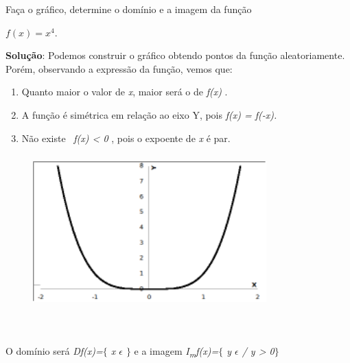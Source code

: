 \begin{texemplo}
Faça o gráfico, determine o domínio e a imagem da função 

\quad  $ f \left( x \right) =x^{4}$.

\begin{justify}
\textbf{Solução}: Podemos construir o gráfico obtendo pontos da função aleatoriamente. Porém, observando a expressão da função, vemos que: 
\end{justify}

\begin{enumerate}[label=(\roman*)]
	\item Quanto maior o valor de \textit{x}, maior será o de \textit{f(x) }. 

	\item A função é simétrica em relação ao eixo Y, pois \textit{f(x) = f(-x).} 

	\item  Não existe~ \textit{f(x) < 0 }, pois o expoente de \textit{x} é par.
\end{enumerate}

\begin{figure}[H]
	\begin{Center}
		\includegraphics[width=3.54in,height=2.34in]{capitulos/outras_funcoes/media/image19.pdf}
	\end{Center}
\end{figure}

~~

O domínio será \textit{Df(x)=$ \{ $ x $ \epsilon $  \textbf{ }$ \} $ } e a imagem \textit{I\textsubscript{m}f(x)=$ \{ $ y $ \epsilon $  \textbf{ }/ y > 0$ \} $ } \qedsymbol{}

\end{texemplo}

